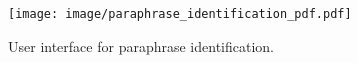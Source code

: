\begin{figure}[t]
 \centering
  \texttt{[image: image/paraphrase\_identification\_pdf.pdf]}
 \caption{User interface for paraphrase identification.}
 \label{fig:user_interface_paraphrase_identification}
\end{figure}
